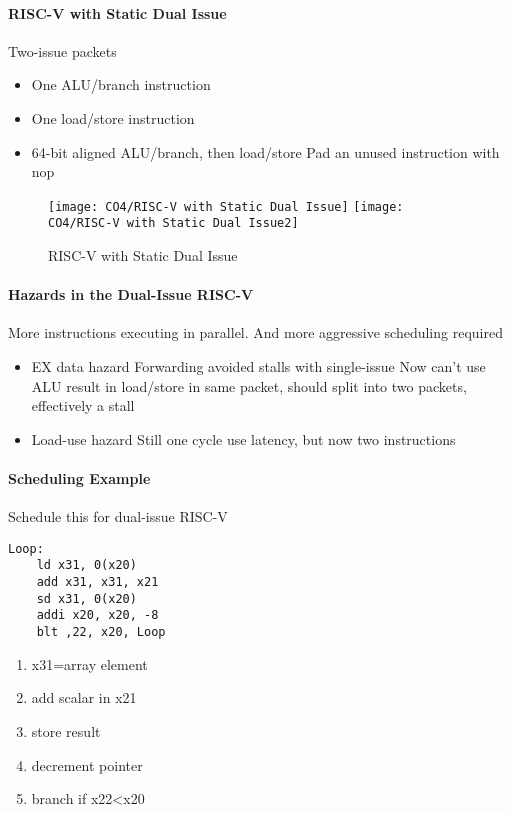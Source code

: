\paragraph{RISC-V with Static Dual Issue}
Two-issue packets
\begin{itemize}\small
    \item One ALU/branch instruction
    \item One load/store instruction
    \item 64-bit aligned
    \subitem ALU/branch, then load/store
    \subitem Pad an unused instruction with nop
\end{itemize}

\begin{figure}[!htb]
    \centering
    \texttt{[image: CO4/RISC-V with Static Dual Issue]}
    \texttt{[image: CO4/RISC-V with Static Dual Issue2]}
    \caption{RISC-V with Static Dual Issue}
\end{figure}

\paragraph{Hazards in the Dual-Issue RISC-V}
More instructions executing in parallel. And more aggressive scheduling required
\begin{itemize}\small
    \item EX data hazard
    \subitem Forwarding avoided stalls with single-issue
    \subitem Now can't use ALU result in load/store in same packet, should split into two packets, effectively a stall
    \item Load-use hazard
    \subitem Still one cycle use latency, but now two instructions
\end{itemize}

\paragraph{Scheduling Example}
Schedule this for dual-issue RISC-V
\begin{lstlisting}[language={[x86masm]Assembler}]
Loop:
    ld x31, 0(x20)
    add x31, x31, x21
    sd x31, 0(x20)
    addi x20, x20, -8
    blt ,22, x20, Loop
\end{lstlisting}
\begin{enumerate}\small
    \item x31=array element
    \item add scalar in x21
    \item store result
    \item decrement pointer
    \item branch if x22<x20
\end{enumerate}

